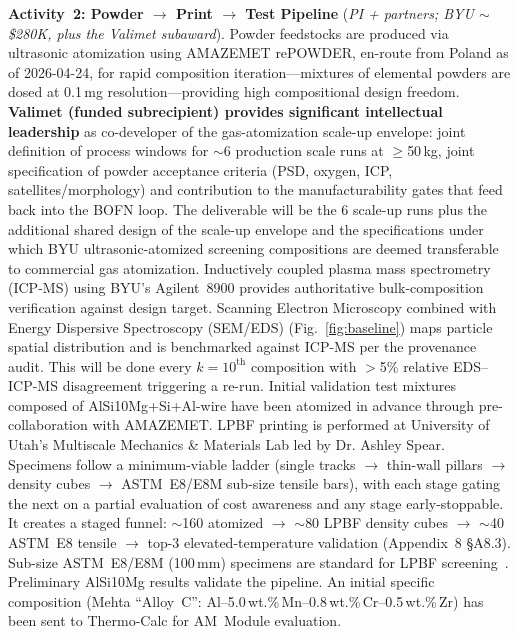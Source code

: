 \documentclass[11pt,letterpaper]{article}
\begin{document}
\textbf{Activity~2: Powder $\to$ Print $\to$ Test Pipeline}
(\emph{PI + partners; BYU {$\sim$}\$280K, plus the Valimet subaward}).
%
Powder feedstocks are produced via ultrasonic atomization using AMAZEMET
rePOWDER, en-route from Poland as of 2026-04-24, for rapid
composition iteration---mixtures of elemental powders are dosed at
0.1\,mg resolution---providing high
compositional design freedom.
\textbf{Valimet (funded subrecipient) provides significant
intellectual leadership} as co-developer of the
gas-atomization scale-up envelope: joint definition of process windows
for $\sim$6 production scale runs at $\geq$50\,kg, joint specification
of powder acceptance criteria (PSD, oxygen, ICP, satellites/morphology) and contribution to the manufacturability gates that feed back into the
BOFN loop. The deliverable will be the 6 scale-up runs plus the additional shared design of the scale-up envelope and the
specifications under which BYU ultrasonic-atomized screening
compositions are deemed transferable to commercial gas atomization.
Inductively coupled plasma mass spectrometry (ICP-MS) using BYU's Agilent~8900 provides authoritative bulk-composition
verification against design target. Scanning Electron Microscopy combined with Energy Dispersive Spectroscopy (SEM/EDS) (Fig.~\ref{fig:baseline})
maps particle spatial distribution and is benchmarked against
ICP-MS per the provenance audit. This will be done every $k{=}10^{\text{th}}$ composition with
$>$5\% relative EDS--ICP-MS disagreement triggering a re-run. Initial
validation test mixtures composed of AlSi10Mg+Si+Al-wire have been
atomized in advance through pre-collaboration with AMAZEMET.
LPBF printing is performed at University of Utah's Multiscale Mechanics \& Materials Lab led by Dr. Ashley Spear. Specimens follow a
minimum-viable ladder (single tracks $\to$ thin-wall pillars $\to$
density cubes $\to$ ASTM~E8/E8M sub-size tensile bars), with each stage
gating the next on a partial evaluation of cost awareness and any stage
early-stoppable. It creates a staged funnel: $\sim$160 atomized $\to$ $\sim$80 LPBF
density cubes
$\to$ $\sim$40 ASTM~E8
tensile $\to$ top-3 elevated-temperature validation
(Appendix~8 \S A8.3).
Sub-size ASTM~E8/E8M (100\,mm) specimens are standard for LPBF
screening~\cite{paraschiv_2023_ma16144930,wang_2020_17452759}.
Preliminary AlSi10Mg results validate the pipeline. An initial specific
composition (Mehta ``Alloy~C'':
Al--5.0\,wt.\%\,Mn--0.8\,wt.\%\,Cr--0.5\,wt.\%\,Zr) has been sent to
Thermo-Calc for AM~Module evaluation.
\end{document}
